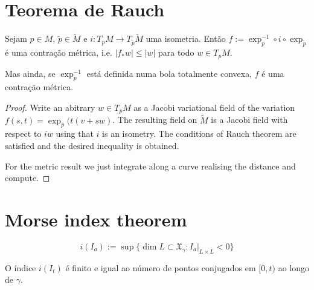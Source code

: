 \section{Teorema de Rauch}
\label{subsection-rauch}

\begin{theorem}[Rauch]
\label{theorem-rauch}
\end{theorem}

\begin{proposition}
\label{proposition-contraction}
Sejam $p \in M$, $\tilde{p} \in \tilde{M}$ e $i:T_pM \to T_{\tilde{p}}\tilde{M}$
uma isometria. Então $f:=\operatorname{exp}^{-1}_p \circ i \circ
\operatorname{exp}_{\tilde{p}}$ é uma contração métrica, i.e. $|f_*w|\leq |w|$
para todo $w \in T_pM$.

Mas ainda, se $\operatorname{exp}_p^{-1}$ está definida numa bola totalmente
convexa, $f$ é uma contração métrica.
\end{proposition}

\begin{proof}
Write an abitrary $w\in T_p M$ as a Jacobi variational field of the variation 
$f(s,t)=\operatorname{exp}_p(t(v+sw)$. The resulting field on $\tilde{M}$ is a
Jacobi field with respect to $iw$ using that $i$ is an isometry. The conditions
of Rauch theorem are satisfied and the desired inequality is obtained.

For the metric result we just integrate along a curve realising the distance and
compute.
\end{proof}

\section{Morse index theorem}
\label{section-morse-index}

\begin{definition}
\label{definition-index-index-form}
$$
i(I_a):=\operatorname{sup}\{\dim L \subset \mathfrak{X}_\gamma:I_a |_{L \times L}<0\}
$$
\end{definition}


\begin{theorem}
\label{theorem-morse-index}
O índice $i(I_t)$ é finito e igual ao número de pontos conjugados em $[0,t)$ ao
longo de $\gamma$.
\end{theorem}

